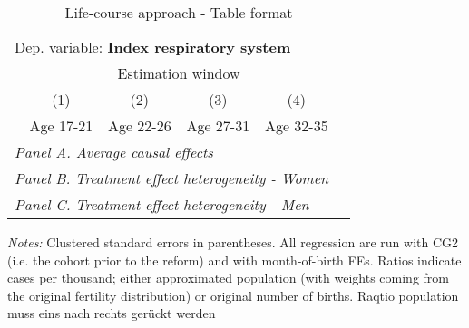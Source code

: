  \begin{table}[H] \centering \begin{threeparttable} \caption{Life-course approach - Table format} {\def\sym#1{\ifmmode^{#1}\else\(^{#1}\)\fi} \begin{tabular}{l*{5}{c}} \toprule \multicolumn{5}{l}{Dep. variable: \textbf{Index respiratory system}} \\ & \multicolumn{4}{c}{Estimation window} \\ \cmidrule(lr){2-5}
            &\multicolumn{1}{c}{(1)}&\multicolumn{1}{c}{(2)}&\multicolumn{1}{c}{(3)}&\multicolumn{1}{c}{(4)}\\
            &\multicolumn{1}{c}{Age 17-21}&\multicolumn{1}{c}{Age 22-26}&\multicolumn{1}{c}{Age 27-31}&\multicolumn{1}{c}{Age 32-35}\\
\midrule
 \multicolumn{5}{l}{\emph{Panel A. Average causal effects}} \\      \midrule\multicolumn{5}{l}{\emph{Panel B. Treatment effect heterogeneity - Women}} \\      \midrule\multicolumn{5}{l}{\emph{Panel C. Treatment effect heterogeneity - Men}} \\      
\bottomrule \end{tabular} } \begin{tablenotes} \item \scriptsize \emph{Notes:} Clustered standard errors in parentheses. All regression are run with CG2 (i.e. the cohort prior to the reform) and with month-of-birth FEs. Ratios indicate cases per thousand; either approximated population (with weights coming from the original fertility distribution) or original number of births. Raqtio population muss eins nach rechts gerückt werden \end{tablenotes} \end{threeparttable} \end{table} 
